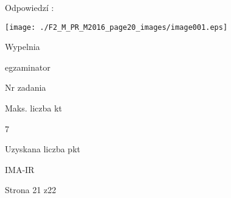 \documentclass[a4paper,12pt]{article}
\begin{document}
Odpowiedzí :
\begin{center}
\texttt{[image: ./F2\_M\_PR\_M2016\_page20\_images/image001.eps]}
\end{center}
Wypelnia

egzaminator

Nr zadania

Maks. liczba kt

7

Uzyskana liczba pkt

IMA-IR

Strona 21 z22
\end{document}
